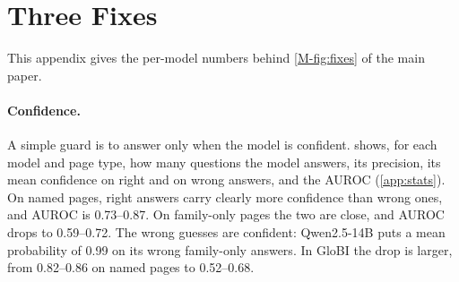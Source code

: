\section{Three Fixes}
\label{app:fixes}

This appendix gives the per-model numbers behind \cref{M-fig:fixes} of the main paper.

\paragraph{Confidence.}
A simple guard is to answer only when the model is confident.  shows, for each model and page type, how many questions the model answers, its precision, its mean confidence on right and on wrong answers, and the AUROC (\cref{app:stats}). On named pages, right answers carry clearly more confidence than wrong ones, and AUROC is 0.73--0.87. On family-only pages the two are close, and AUROC drops to 0.59--0.72. The wrong guesses are confident: Qwen2.5-14B puts a mean probability of 0.99 on its wrong family-only answers. In GloBI the drop is larger, from 0.82--0.86 on named pages to 0.52--0.68.

